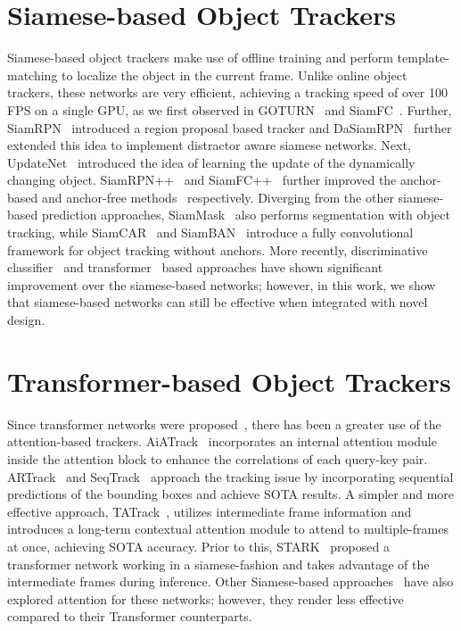 \section{Siamese-based Object Trackers}
Siamese-based object trackers make use of offline training and perform template-matching to localize the object in the current frame. Unlike online object trackers, these networks are very efficient, achieving a tracking speed of over 100 FPS on a single GPU, as we first observed in GOTURN~\cite{held2016learning} and SiamFC~\cite{bertinetto2016fully}. Further, SiamRPN~\cite{li2018high} introduced a region proposal based tracker and DaSiamRPN~\cite{zhu2018distractor} further extended this idea to implement distractor aware siamese networks. Next, UpdateNet~\cite{zhang2019learning} introduced the idea of learning the update of the dynamically changing object. SiamRPN++~\cite{li2019siamrpn++} and SiamFC++~\cite{xu2020siamfc++} further improved the anchor-based and anchor-free methods~\cite{bertinetto2016fully} respectively. Diverging from the other siamese-based prediction approaches, SiamMask~\cite{wang2019fast} also performs segmentation with object tracking, while SiamCAR~\cite{guo2020siamcar} and SiamBAN~\cite{chen2020siamese} introduce a fully convolutional framework for object tracking without anchors. More recently, discriminative classifier~\cite{mayer2021learning} and transformer~\cite{yan2021learning, cui2022mixformer} based approaches have shown significant improvement over the siamese-based networks; however, in this work, we show that siamese-based networks can still be effective when integrated with novel design. 


\section{Transformer-based Object Trackers}
Since transformer networks were proposed~\cite{vaswani2017attention, dosovitskiy2020image}, there has been a greater use of the attention-based trackers. AiATrack~\cite{gao2022aiatrack} incorporates an internal attention module inside the attention block to enhance the correlations of each query-key pair. ARTrack~\cite{wei2023autoregressive} and SeqTrack~\cite{chen2023seqtrack} approach the tracking issue by incorporating sequential predictions of the bounding boxes and achieve SOTA results. A simpler and more effective approach, TATrack~\cite{he2023target}, utilizes intermediate frame information and introduces a long-term contextual attention module to attend to multiple-frames at once, achieving SOTA accuracy. Prior to this, STARK~\cite{yan2021learning} proposed a transformer network working in a siamese-fashion and takes advantage of the intermediate frames during inference. Other Siamese-based approaches~\cite{yu2020deformable, yang2020siamatt} have also explored attention for these networks; however, they render less effective compared to their Transformer counterparts. 


